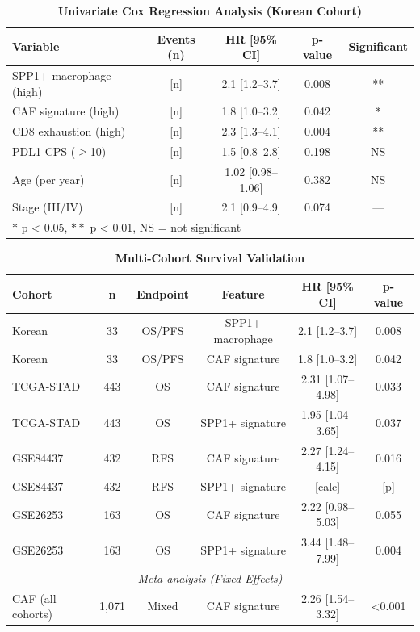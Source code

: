 \documentclass[12pt,twoside]{article}
\begin{document}
\begin{table}[H]
\centering
\caption{\textbf{Univariate Cox Regression Analysis (Korean Cohort)}}
\label{table:2}
\small
\begin{tabular}{l | c c c c}
\toprule
\textbf{Variable} & \textbf{Events (n)} & \textbf{HR [95\% CI]} & \textbf{p-value} & \textbf{Significant} \\
\midrule
SPP1+ macrophage (high) & [n] & 2.1 [1.2--3.7] & 0.008 & ** \\
CAF signature (high) & [n] & 1.8 [1.0--3.2] & 0.042 & * \\
CD8 exhaustion (high) & [n] & 2.3 [1.3--4.1] & 0.004 & ** \\
PDL1 CPS ($\geq$10) & [n] & 1.5 [0.8--2.8] & 0.198 & NS \\
Age (per year) & [n] & 1.02 [0.98--1.06] & 0.382 & NS \\
Stage (III/IV) & [n] & 2.1 [0.9--4.9] & 0.074 & --- \\
\bottomrule
\multicolumn{5}{l}{$*$ p < 0.05, $**$ p < 0.01, NS = not significant} \\
\end{tabular}
\end{table}

\begin{table}[H]
\centering
\caption{\textbf{Multi-Cohort Survival Validation}}
\label{table:3}
\small
\begin{tabular}{l | c c c c c}
\toprule
\textbf{Cohort} & \textbf{n} & \textbf{Endpoint} & \textbf{Feature} & \textbf{HR [95\% CI]} & \textbf{p-value} \\
\midrule
Korean & 33 & OS/PFS & SPP1+ macrophage & 2.1 [1.2--3.7] & 0.008 \\
Korean & 33 & OS/PFS & CAF signature & 1.8 [1.0--3.2] & 0.042 \\
\midrule
TCGA-STAD & 443 & OS & CAF signature & 2.31 [1.07--4.98] & 0.033 \\
TCGA-STAD & 443 & OS & SPP1+ signature & 1.95 [1.04--3.65] & 0.037 \\
\midrule
GSE84437 & 432 & RFS & CAF signature & 2.27 [1.24--4.15] & 0.016 \\
GSE84437 & 432 & RFS & SPP1+ signature & [calc] & [p] \\
\midrule
GSE26253 & 163 & OS & CAF signature & 2.22 [0.98--5.03] & 0.055 \\
GSE26253 & 163 & OS & SPP1+ signature & 3.44 [1.48--7.99] & 0.004 \\
\midrule
\multicolumn{6}{c}{\textit{Meta-analysis (Fixed-Effects)}} \\
CAF (all cohorts) & 1,071 & Mixed & CAF signature & 2.26 [1.54--3.32] & <0.001 \\
\bottomrule
\end{tabular}
\end{table}
\end{document}
